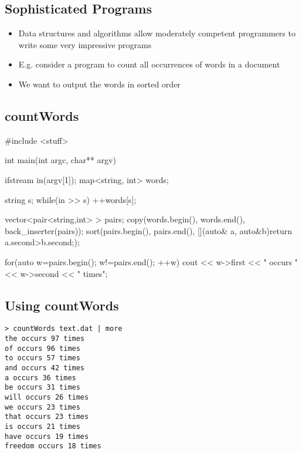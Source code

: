 \Outline

\begin{slide}
\section{Sophisticated Programs}

\begin{PauseHighLight}
  \begin{itemize}
  \item Data structures and algorithms allow moderately competent
    programmers to write some very impressive programs\pause
  \item E.g. consider a program to count all occurrences of words in a
    document\pause
  \item We want to output the words in sorted order\pause
\end{itemize}
\end{PauseHighLight}
\end{slide}


\begin{slide}
\section{countWords}

\begin{cpp}
#include <stuff>
  
int main(int argc, char** argv) {
  ifstream in(argv[1]);
  map<string, int> words;

  string s;
  while(in >> s) {
    ++words[s];
  }
  
  vector<pair<string,int> > pairs;
  copy(words.begin(), words.end(), back_inserter(pairs));
  sort(pairs.begin(), pairs.end(),
    [](auto& a, auto&b){return a.second>b.second;});
  
  for(auto w=pairs.begin(); w!=pairs.end(); ++w) {
    cout << w->first << " occurs " << w->second << " times\n";
  }
}
\end{cpp}
\end{slide}



\begin{slide}
\section[-1]{Using countWords}

\begin{verbatim}
> countWords text.dat | more
the occurs 97 times
of occurs 96 times
to occurs 57 times
and occurs 42 times
a occurs 36 times
be occurs 31 times
will occurs 26 times
we occurs 23 times
that occurs 23 times
is occurs 21 times
have occurs 19 times
freedom occurs 18 times
\end{verbatim}
\end{slide}

